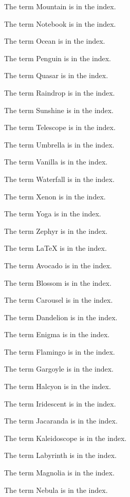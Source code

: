 The term Mountain  is in the index.

The term Notebook  is in the index.

The term Ocean  is in the index.

The term Penguin  is in the index.

The term Quasar  is in the index.

The term Raindrop  is in the index.

The term Sunshine  is in the index.

The term Telescope  is in the index.

The term Umbrella  is in the index.

The term Vanilla  is in the index.

The term Waterfall  is in the index.

The term Xenon  is in the index.

The term Yoga  is in the index.

The term Zephyr  is in the index.

The term \LaTeX {} is in the index.

The term Avocado  is in the index.

The term Blossom  is in the index.

The term Carousel  is in the index.

The term Dandelion  is in the index.

The term Enigma  is in the index.

The term Flamingo  is in the index.

The term Gargoyle  is in the index.

The term Halcyon  is in the index.

The term Iridescent  is in the index.

The term Jacaranda  is in the index.

The term Kaleidoscope  is in the index.

The term Labyrinth  is in the index.

The term Magnolia  is in the index.

The term Nebula  is in the index.

